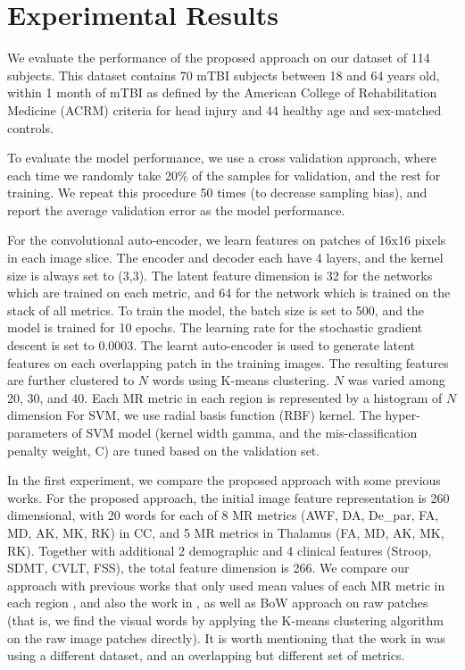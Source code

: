 \documentclass[letterpaper, 10 pt, conference]{ieeeconf}  %
\begin{document}
\section{Experimental Results}
We evaluate the performance of the proposed approach on our dataset of 114 subjects. 
This dataset contains 70 mTBI subjects between 18 and 64 years old, within 1 month of mTBI as defined by the American College of Rehabilitation Medicine (ACRM) criteria for head injury and 44 healthy age and sex-matched controls. 

To evaluate the model performance, we use  a cross validation approach, where each time we randomly take 20\% of the samples for validation, and the rest for training. 
We repeat this procedure 50 times (to decrease sampling bias), and report the average validation error as the model performance.

For the convolutional auto-encoder, we learn features on patches of 16x16 pixels in each image slice.
The encoder and decoder each have 4 layers, and the kernel size is always set to (3,3). 
The latent feature dimension is 32 for the networks which are trained on each metric, and 64 for the network which is trained on the stack of all metrics.
To train the model, the batch size is set to 500, and the model is trained for 10 epochs. The learning rate for the stochastic gradient descent is set to 0.0003.
The learnt auto-encoder is used to generate latent features on each overlapping patch in the training images. The resulting features are further clustered to $N$ words using K-means clustering. $N$ was varied among 20, 30, and 40. Each  MR metric in each region is represented by a histogram of $N$ dimension
For SVM, we use radial basis function (RBF) kernel. 
The hyper-parameters of SVM model (kernel width gamma, and the mis-classification penalty weight, C) are tuned based on the validation set.




In the first experiment, we compare the proposed approach with some previous works. 
For the proposed approach, the initial image feature representation is 260 dimensional, with 20 words for each of 8 MR metrics (AWF, DA, De\_par, FA, MD, AK, MK, RK) in CC, and 5 MR metrics in Thalamus (FA, MD, AK, MK, RK).
Together with additional 2 demographic and 4 clinical features (Stroop, SDMT, CVLT, FSS), the total feature dimension is 266.
We compare our approach with previous works that only used mean values of each MR metric in each region \cite{minaee1}, and also the work in \cite{yuanyi}, as well as BoW approach on raw patches \cite{minaee1} (that is, we find the visual words by applying the K-means clustering algorithm on the raw image patches directly).
It is worth  mentioning that the work in \cite{yuanyi} was using a different dataset, and an overlapping but different set of metrics.
\end{document}
